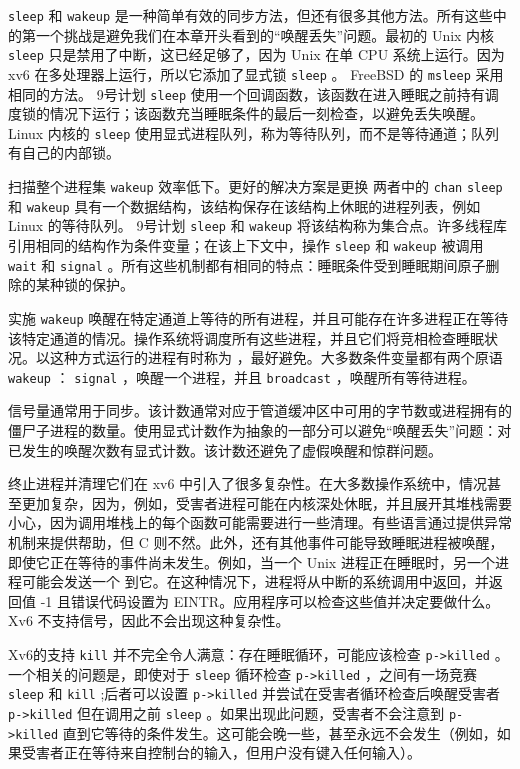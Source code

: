    \lstinline{sleep}    和
    \lstinline{wakeup}   是一种简单有效的同步方法，但还有很多其他方法。所有这些中的第一个挑战是避免我们在本章开头看到的“唤醒丢失”问题。最初的 Unix 内核
    \lstinline{sleep}    只是禁用了中断，这已经足够了，因为 Unix 在单 CPU 系统上运行。因为 xv6 在多处理器上运行，所以它添加了显式锁
    \lstinline{sleep}    。 FreeBSD 的
    \lstinline{msleep}    采用相同的方法。 9号计划
    \lstinline{sleep}    使用一个回调函数，该函数在进入睡眠之前持有调度锁的情况下运行；该函数充当睡眠条件的最后一刻检查，以避免丢失唤醒。 Linux 内核的
    \lstinline{sleep}    使用显式进程队列，称为等待队列，而不是等待通道；队列有自己的内部锁。  

扫描整个进程集
    \lstinline{wakeup}    效率低下。更好的解决方案是更换
 两者中的    \lstinline{chan}   
    \lstinline{sleep}    和
    \lstinline{wakeup}    具有一个数据结构，该结构保存在该结构上休眠的进程列表，例如 Linux 的等待队列。 9号计划
    \lstinline{sleep}    和
    \lstinline{wakeup}    将该结构称为集合点。许多线程库引用相同的结构作为条件变量；在该上下文中，操作
    \lstinline{sleep}    和
    \lstinline{wakeup}    被调用
    \lstinline{wait}    和
    \lstinline{signal}    。所有这些机制都有相同的特点：睡眠条件受到睡眠期间原子删除的某种锁的保护。  

实施
    \lstinline{wakeup}    唤醒在特定通道上等待的所有进程，并且可能存在许多进程正在等待该特定通道的情况。操作系统将调度所有这些进程，并且它们将竞相检查睡眠状况。以这种方式运行的进程有时称为
        ，最好避免。大多数条件变量都有两个原语
    \lstinline{wakeup}   ：
    \lstinline{signal}    ，唤醒一个进程，并且
    \lstinline{broadcast}    ，唤醒所有等待进程。  

信号量通常用于同步。该计数通常对应于管道缓冲区中可用的字节数或进程拥有的僵尸子进程的数量。使用显式计数作为抽象的一部分可以避免“唤醒丢失”问题：对已发生的唤醒次数有显式计数。该计数还避免了虚假唤醒和惊群问题。  

终止进程并清理它们在 xv6 中引入了很多复杂性。在大多数操作系统中，情况甚至更加复杂，因为，例如，受害者进程可能在内核深处休眠，并且展开其堆栈需要小心，因为调用堆栈上的每个函数可能需要进行一些清理。有些语言通过提供异常机制来提供帮助，但 C 则不然。此外，还有其他事件可能导致睡眠进程被唤醒，即使它正在等待的事件尚未发生。例如，当一个 Unix 进程正在睡眠时，另一个进程可能会发送一个
        到它。在这种情况下，进程将从中断的系统调用中返回，并返回值 -1 且错误代码设置为 EINTR。应用程序可以检查这些值并决定要做什么。 Xv6 不支持信号，因此不会出现这种复杂性。  

Xv6的支持
    \lstinline{kill}    并不完全令人满意：存在睡眠循环，可能应该检查
    \lstinline{p->killed}    。一个相关的问题是，即使对于
    \lstinline{sleep}    循环检查
    \lstinline{p->killed}    ，之间有一场竞赛
    \lstinline{sleep}    和
    \lstinline{kill}    ;后者可以设置
    \lstinline{p->killed}    并尝试在受害者循环检查后唤醒受害者
    \lstinline{p->killed}    但在调用之前
    \lstinline{sleep}    。如果出现此问题，受害者不会注意到
    \lstinline{p->killed}    直到它等待的条件发生。这可能会晚一些，甚至永远不会发生（例如，如果受害者正在等待来自控制台的输入，但用户没有键入任何输入）。  


